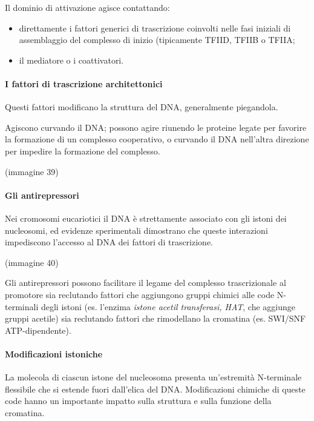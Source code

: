 \documentclass[11pt]{book}
\begin{document}
Il dominio di attivazione agisce contattando:

\begin{itemize}
\itemsep1pt\parskip0pt
\item
  direttamente i fattori generici di trascrizione coinvolti nelle fasi
  iniziali di assemblaggio del complesso di inizio (tipicamente TFIID,
  TFIIB o TFIIA;
\item
  il mediatore o i coattivatori.
\end{itemize}

\paragraph{I fattori di trascrizione
architettonici}\label{i-fattori-di-trascrizione-architettonici}

Questi fattori modificano la struttura del DNA, generalmente piegandola.

Agiscono curvando il DNA; possono agire riunendo le proteine legate per
favorire la formazione di un complesso cooperativo, o curvando il DNA
nell'altra direzione per impedire la formazione del complesso.

(immagine 39)

\paragraph{Gli antirepressori}\label{gli-antirepressori}

Nei cromosomi eucariotici il DNA è strettamente associato con gli istoni
dei nucleosomi, ed evidenze sperimentali dimostrano che queste
interazioni impediscono l'accesso al DNA dei fattori di trascrizione.

(immagine 40)

Gli antirepressori possono facilitare il legame del complesso
trascrizionale al promotore sia reclutando fattori che aggiungono gruppi
chimici alle code N-terminali degli istoni (es. l'enzima \emph{istone
acetil transferasi, HAT}, che aggiunge gruppi acetile) sia reclutando
fattori che rimodellano la cromatina (es. SWI/SNF ATP-dipendente).

\paragraph{Modificazioni istoniche}\label{modificazioni-istoniche}

La molecola di ciascun istone del nucleosoma presenta un'estremità
N-terminale flessibile che si estende fuori dall'elica del DNA.
Modificazioni chimiche di queste code hanno un importante impatto sulla
struttura e sulla funzione della cromatina.
\end{document}
